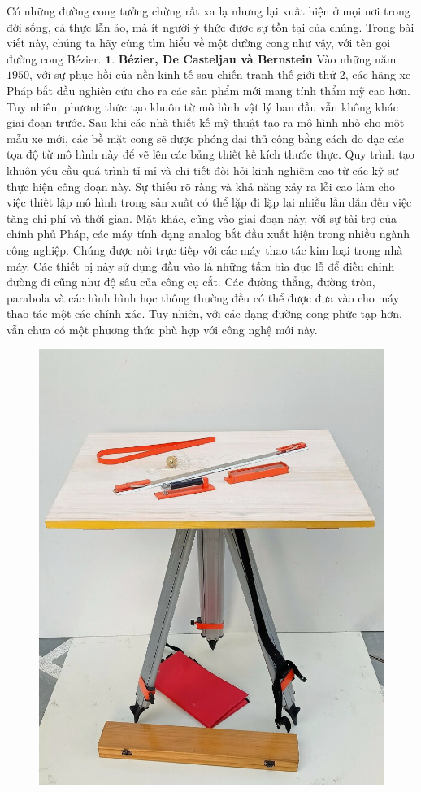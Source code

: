 \begin{multicols}{2}
	Có những đường cong tưởng chừng rất xa lạ nhưng lại xuất hiện ở mọi nơi trong đời sống, cả thực lẫn ảo, mà ít người ý thức được sự tồn tại của chúng. Trong bài viết này, chúng ta hãy cùng tìm hiểu về một đường cong như vậy, với tên gọi đường cong Bézier.
	\vskip 0.1cm
	$\pmb{1.}$ \textbf{\color{toanhocdoisong}Bézier, De Casteljau và Bernstein}
	\vskip 0.1cm
	Vào những năm $1950$, với sự phục hồi của nền kinh tế sau chiến tranh thế giới thứ $2$, các hãng xe Pháp bắt đầu nghiên cứu cho ra các sản phẩm mới mang tính thẩm mỹ cao hơn. Tuy nhiên, phương thức tạo khuôn từ mô hình vật lý ban đầu vẫn không khác giai đoạn trước. Sau khi các nhà thiết kế mỹ thuật tạo ra mô hình nhỏ cho một mẫu xe mới, các bề mặt cong sẽ được phóng đại thủ công bằng cách đo đạc các tọa độ từ mô hình này để vẽ lên các bảng thiết kế kích thước thực. Quy trình tạo khuôn yêu cầu quá trình tỉ mỉ và chi tiết đòi hỏi kinh nghiệm cao từ các kỹ sư thực hiện công đoạn này. Sự thiếu rõ ràng và khả năng xảy ra lỗi cao làm cho việc thiết lập mô hình trong sản xuất có thể lặp đi lặp lại nhiều lần dẫn đến việc tăng chi phí và thời gian.
	\vskip 0.1cm
	Mặt khác, cũng vào giai đoạn này, với sự tài trợ của chính phủ Pháp, các máy tính dạng analog bắt đầu xuất hiện trong nhiều ngành công nghiệp. Chúng được nối trực tiếp với các máy thao tác kim loại trong nhà máy. Các thiết bị này sử dụng đầu vào là những tấm bìa đục lỗ để điều chỉnh đường đi cũng như độ sâu của công cụ cắt. Các đường thẳng, đường tròn, parabola và các hình hình học thông thường đều có thể được đưa vào cho máy thao tác một các chính xác. Tuy nhiên, với các dạng đường cong phức tạp hơn, vẫn chưa có một phương thức phù hợp với công nghệ mới này.
	\begin{figure}[H]
		\vspace*{-5pt}
		\centering
		\captionsetup{labelformat= empty, justification=centering}
		\includegraphics[width= 0.7\linewidth]{1}

\end{figure}
\end{multicols}
